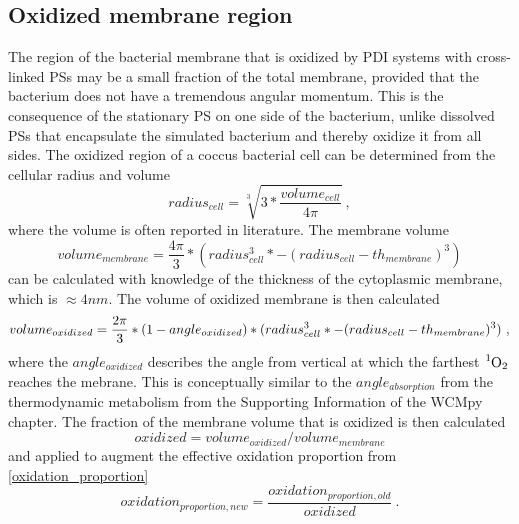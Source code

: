 \subsection{Oxidized membrane region}
The region of the bacterial membrane that is oxidized by PDI systems with cross-linked PSs may be a small fraction of the total membrane, provided that the bacterium does not have a tremendous angular momentum. This is the consequence of the stationary PS on one side of the bacterium, unlike dissolved PSs that encapsulate the simulated bacterium and thereby oxidize it from all sides. The oxidized region of a coccus bacterial cell can be determined from the cellular radius and volume
\begin{equation}
    radius_{cell} = \sqrt[3]{3*\frac{volume_{cell}}{4\pi}}~,
\end{equation}
where the volume is often reported in literature. The membrane volume 
\begin{equation}
    volume_{membrane} = \frac{4\pi}{3}*(radius_{cell}^3* - (radius_{cell}-th_{membrane})^3)
\end{equation}
can be calculated with knowledge of the thickness of the cytoplasmic membrane, which is $\approx 4 nm$. The volume of oxidized membrane is then calculated
\begin{equation}
    volume_{oxidized} = \frac{2\pi}{3}*(1-angle_{oxidized})\\ 
        *(radius_{cell}^3* - (radius_{cell}-th_{membrane})^3)~,    
\end{equation}
where the $angle_{oxidized}$ describes the angle from vertical at which the farthest $\ce{^1O2}$ reaches the mebrane. This is conceptually similar to the $angle_{absorption}$ from the thermodynamic metabolism from the Supporting Information of the WCMpy chapter. The fraction of the membrane volume that is oxidized is then calculated 
\begin{equation}
    oxidized = volume_{oxidized} / volume_{membrane} 
\end{equation}
and applied to augment the effective oxidation proportion from \cref{oxidation_proportion}
\begin{equation}
    oxidation_{proportion,new} = \frac{oxidation_{proportion,old}}{oxidized}~.
\end{equation}
